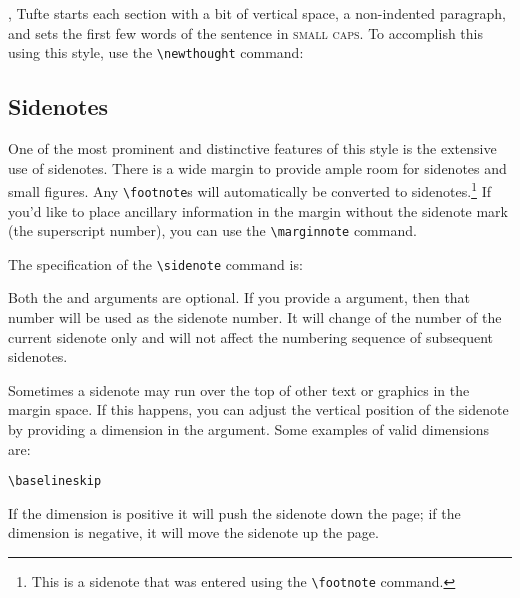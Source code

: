 \documentclass{tufte-handout}
\begin{document}
,\cite{Tufte2006} Tufte
starts each section with a bit of vertical space, a non-indented paragraph,
and sets the first few words of the sentence in \textsc{small caps}.  To
accomplish this using this style, use the \Verb|\newthought| command:
\begin{docspec}
\end{docspec}

\subsection{Sidenotes}\label{sec:sidenotes}
One of the most prominent and distinctive features of this style is the
extensive use of sidenotes.  There is a wide margin to provide ample room
for sidenotes and small figures.  Any \Verb|\footnote|s will automatically
be converted to sidenotes.\footnote{This is a sidenote that was entered
using the \texttt{\textbackslash footnote} command.}  If you'd like to place ancillary
information in the margin without the sidenote mark (the superscript
number), you can use the \Verb|\marginnote| command.

The specification of the \Verb|\sidenote| command is:
\begin{docspec}
\end{docspec}

Both the  and  arguments are optional.  If you
provide a  argument, then that number will be used as the
sidenote number.  It will change of the number of the current sidenote only and
will not affect the numbering sequence of subsequent sidenotes.

Sometimes a sidenote may run over the top of other text or graphics in the
margin space.  If this happens, you can adjust the vertical position of the
sidenote by providing a dimension in the  argument.  Some
examples of valid dimensions are:
\begin{docspec}
  \ttfamily 1.0in \qquad 2.54cm \qquad 254mm \Verb|\baselineskip|
\end{docspec}
If the dimension is positive it will push the sidenote down the page; if the
dimension is negative, it will move the sidenote up the page.
\end{document}
